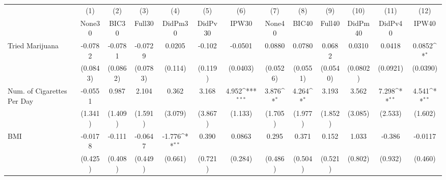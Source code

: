 {
\def\sym#1{\ifmmode^{#1}\else\(^{#1}\)\fi}
\begin{tabular}{l*{12}{c}}
\toprule
            &\multicolumn{1}{c}{(1)}&\multicolumn{1}{c}{(2)}&\multicolumn{1}{c}{(3)}&\multicolumn{1}{c}{(4)}&\multicolumn{1}{c}{(5)}&\multicolumn{1}{c}{(6)}&\multicolumn{1}{c}{(7)}&\multicolumn{1}{c}{(8)}&\multicolumn{1}{c}{(9)}&\multicolumn{1}{c}{(10)}&\multicolumn{1}{c}{(11)}&\multicolumn{1}{c}{(12)}\\
            &\multicolumn{1}{c}{None30}&\multicolumn{1}{c}{BIC30}&\multicolumn{1}{c}{Full30}&\multicolumn{1}{c}{DidPm30}&\multicolumn{1}{c}{DidPv30}&\multicolumn{1}{c}{IPW30}&\multicolumn{1}{c}{None40}&\multicolumn{1}{c}{BIC40}&\multicolumn{1}{c}{Full40}&\multicolumn{1}{c}{DidPm40}&\multicolumn{1}{c}{DidPv40}&\multicolumn{1}{c}{IPW40}\\
\midrule
Tried Marijuana&     -0.0782         &     -0.0781         &     -0.0729         &      0.0205         &      -0.102         &     -0.0501         &      0.0880         &      0.0780         &      0.0682         &      0.0310         &      0.0418         &      0.0852\sym{*}  \\
            &    (0.0843)         &    (0.0862)         &    (0.0783)         &     (0.114)         &     (0.119)         &    (0.0403)         &    (0.0526)         &    (0.0551)         &    (0.0540)         &    (0.0802)         &    (0.0921)         &    (0.0390)         \\
\addlinespace
Num. of Cigarettes Per Day&     -0.0551         &       0.987         &       2.104         &       0.362         &       3.168         &       4.952\sym{***}&       3.876\sym{*}  &       4.264\sym{*}  &       3.193         &       3.562         &       7.298\sym{**} &       4.541\sym{**} \\
            &     (1.341)         &     (1.409)         &     (1.591)         &     (3.079)         &     (3.867)         &     (1.133)         &     (1.705)         &     (1.977)         &     (1.852)         &     (3.085)         &     (2.533)         &     (1.602)         \\
\addlinespace
BMI         &     -0.0178         &      -0.111         &     -0.0647         &      -1.776\sym{**} &       0.390         &      0.0863         &       0.295         &       0.371         &       0.152         &       1.033         &      -0.386         &     -0.0117         \\
            &     (0.425)         &     (0.408)         &     (0.449)         &     (0.661)         &     (0.721)         &     (0.284)         &     (0.486)         &     (0.504)         &     (0.521)         &     (0.802)         &     (0.932)         &     (0.460)         \\

\end{tabular}}
